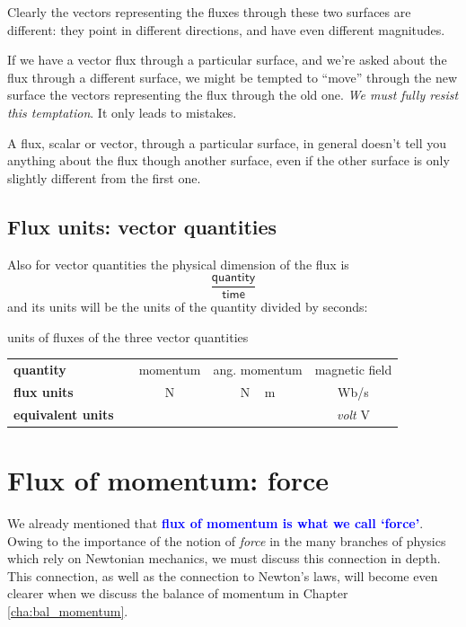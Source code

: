 \documentclass[a4paper,12pt,%
onecolumn,oneside,titlepage,%
british%
]{memoir}
\renewcommand*{\|}[1][]{\nonscript\:#1\vert\nonscript\:\mathopen{}}
\newcommand*{\sect}{\S}%
\newcommand*{\chap}{Chapter}%
\renewcommand*{\autoref}[2]{\sidepar{\vspace{-1ex}\footnotesize{\color{blue}\faIcon{%
angle-right%
}\enspace\sect\,\ref{#1} page\,\pageref{#1}}}\textcolor{blue}{#2}}
\begin{document}
Clearly the vectors representing the fluxes through these two surfaces are different: they point in different directions, and have even different magnitudes.

If we have a vector flux through a particular surface, and we're asked about the flux through a different surface, we might be tempted to \enquote{move} through the new surface the vectors representing the flux through the old one. \emph{We must fully resist this temptation}. It only leads to mistakes.
\begin{warning}
  A flux, scalar or vector, through a particular surface, in general doesn't tell you anything about the flux though another surface, even if the other surface is only slightly different from the first one.
\end{warning}

\subsection{Flux units: vector quantities}

Also for vector quantities the physical dimension of the flux is
\begin{equation*}
  \frac{\textsf{quantity}}{\textsf{time}}
\end{equation*}
and its units will be the units of the quantity divided by seconds:
\begin{definition}{units of fluxes of the three vector quantities}
  \centering
  \begin{tabular*}{\linewidth}{@{\extracolsep{\fill}}lcccc}
    \textbf{quantity}&& momentum & ang. momentum & magnetic field
    \\[2\jot]
    \textbf{flux units}&& \unit{N} & \unit{N\,m} & \unit{Wb/s}
    \\[2\jot]
    \textbf{equivalent units}&& &  & \emph{volt} \unit{V}
  \end{tabular*}
  \label{tab:fluxes_vector_units}
\end{definition}


\section{Flux of momentum: force}
\label{sec:force_is_flux}

We already mentioned that \autoref{sec:intro_momentum}{\textbf{flux of momentum is what we call \enquote*{force}}}. Owing to the importance of the notion of \emph{force} in the many branches of physics which rely on Newtonian mechanics, we must discuss this connection in depth. This connection, as well as the connection to Newton's laws, will become even clearer when we discuss the balance of momentum in \chap\,\ref{cha:bal_momentum}.
\end{document}
